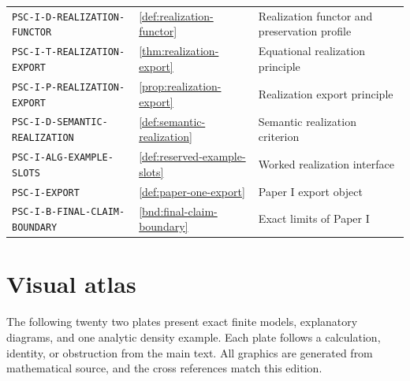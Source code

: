 \begin{longtable}{@{}p{}p{}p{}@{}}
\nolinkurl{PSC-I-D-REALIZATION-FUNCTOR} & \ref{def:realization-functor} & Realization functor and preservation profile \\
\nolinkurl{PSC-I-T-REALIZATION-EXPORT} & \ref{thm:realization-export} & Equational realization principle \\
\nolinkurl{PSC-I-P-REALIZATION-EXPORT} & \ref{prop:realization-export} & Realization export principle \\
\nolinkurl{PSC-I-D-SEMANTIC-REALIZATION} & \ref{def:semantic-realization} & Semantic realization criterion \\
\nolinkurl{PSC-I-ALG-EXAMPLE-SLOTS} & \ref{def:reserved-example-slots} & Worked realization interface \\
\nolinkurl{PSC-I-EXPORT} & \ref{def:paper-one-export} & Paper I export object \\
\nolinkurl{PSC-I-B-FINAL-CLAIM-BOUNDARY} & \ref{bnd:final-claim-boundary} & Exact limits of Paper I \\
\bottomrule\end{longtable}\normalsize
\clearpage\section{Visual atlas}\label{app:visual-atlas}
The following twenty two plates present exact finite models, explanatory diagrams, and one analytic density example. Each plate follows a calculation, identity, or obstruction from the main text. All graphics are generated from mathematical source, and the cross references match this edition.

